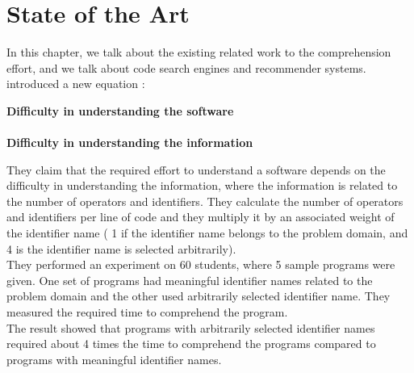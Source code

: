 \documentclass[12pt,mscthesis]{usiinfthesis}
\begin{document}
\chapter{State of the Art}
	In this chapter, we talk about the existing related work to the comprehension effort, and we talk about code search engines and recommender systems.\\ 

	\citet{Kushwaha:2006:ICI:1163514.1163533} introduced a new equation :\\
	\begin{center}
	 \textbf{Difficulty in understanding the software}\\
	 \approx\\
	  \textbf{Difficulty in understanding the information}
	  \end{center}

	They claim that the required effort to understand a software depends on the difficulty in understanding the information, where the information is related to the number of operators and identifiers. They calculate the number of operators and identifiers per line of code and they multiply it by an associated weight of the identifier name ( 1 if the identifier name belongs to the problem domain, and 4 is the identifier name is selected arbitrarily). \\
	They performed an experiment on 60 students, where 5 sample programs were given. One set of programs had meaningful identifier names related to the problem domain and the other used arbitrarily selected identifier name. They measured the required time to comprehend the program.\\ 
	The result showed that programs with arbitrarily selected identifier names required about 4 times the time to comprehend the programs compared to programs with meaningful identifier names.\\
\end{document}
